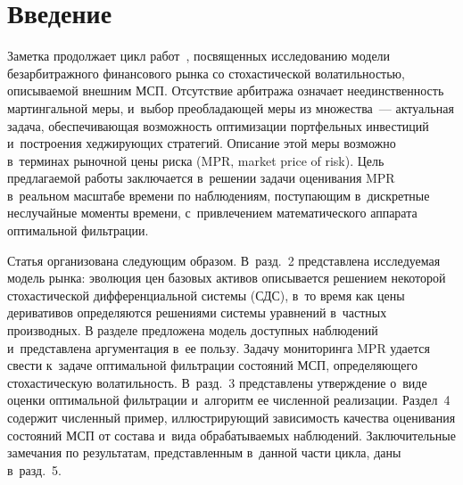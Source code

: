 
  
\vspace*{-6pt}



\thispagestyle{headings}

\begin{multicols}{2}

\label{st\stat}


\section{Введение}

Заметка продолжает цикл работ~\cite{B_23_1_IA, B_23_2_IA}, посвященных 
исследованию модели безарбитражного финансового рынка со стохастической 
во\-ла\-тиль\-ностью, описываемой внешним МСП. 
Отсутствие арбитража означает неединственность мартингальной меры, и~выбор
преобладающей меры из множества~--- актуальная задача, обеспечивающая возможность 
оптимизации портфельных инвестиций и~по\-стро\-ения хеджирующих стратегий.
Описание этой меры возможно в~терминах рыночной цены рис\-ка (MPR, market price of risk). Цель 
предлагаемой работы заключается в~решении задачи оценивания MPR в~реальном 
масштабе времени по наблюдениям, по\-сту\-па\-ющим в~дискретные неслучайные моменты 
времени, с~привлечением математического аппарата оптимальной фильтрации.

Статья организована следующим образом. В~разд.~2 представлена исследуемая 
модель рынка: эволюция цен базовых активов описывается решением некоторой 
стохастической дифференциальной системы (СДС), в~то время как цены деривативов 
определяются  решениями системы уравнений в~частных производных.  В разделе 
предложена модель доступных наблюдений и~представлена аргументация в~ее пользу. 
Задачу мониторинга MPR удается свести к~задаче оптимальной фильтрации состояний 
МСП, определяющего стохастическую волатильность. В~разд.~3 пред\-став\-ле\-ны 
утверждение о~виде оценки оптимальной фильт\-ра\-ции и~алгоритм ее чис\-лен\-ной 
реализации. Раздел~4 содержит чис\-лен\-ный пример, ил\-люст\-ри\-ру\-ющий за\-ви\-си\-мость 
качества оценивания со\-сто\-яний МСП от со\-ста\-ва и~вида об\-ра\-ба\-ты\-ва\-емых наблюдений. 
Заключительные замечания по результатам, пред\-став\-лен\-ным в~данной час\-ти цик\-ла, 
даны в~разд.~5.


\end{multicols}
